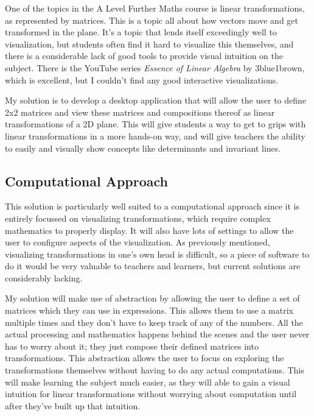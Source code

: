 \documentclass[../main.tex]{subfiles}
\begin{document}
One of the topics in the A Level Further Maths course is linear transformations, as represented by matrices. This is a topic all about how vectors move and get transformed in the plane. It's a topic that lends itself exceedingly well to visualization, but students often find it hard to visualize this themselves, and there is a considerable lack of good tools to provide visual intuition on the subject. There is the YouTube series \textit{Essence of Linear Algebra} by 3blue1brown\cite{essence-of-linear-algebra}, which is excellent, but I couldn't find any good interactive visualizations.

My solution is to develop a desktop application that will allow the user to define 2x2 matrices and view these matrices and compositions thereof as linear transformations of a 2D plane. This will give students a way to get to grips with linear transformations in a more hands-on way, and will give teachers the ability to easily and visually show concepts like determinants and invariant lines.

\subsection{Computational Approach}

This solution is particularly well suited to a computational approach since it is entirely focussed on visualizing transformations, which require complex mathematics to properly display. It will also have lots of settings to allow the user to configure aspects of the visualization. As previously mentioned, visualizing transformations in one's own head is difficult, so a piece of software to do it would be very valuable to teachers and learners, but current solutions are considerably lacking.

My solution will make use of abstraction by allowing the user to define a set of matrices which they can use in expressions. This allows them to use a matrix multiple times and they don't have to keep track of any of the numbers. All the actual processing and mathematics happens behind the scenes and the user never has to worry about it; they just compose their defined matrices into transformations. This abstraction allows the user to focus on exploring the transformations themselves without having to do any actual computations. This will make learning the subject much easier, as they will able to gain a visual intuition for linear transformations without worrying about computation until after they've built up that intuition.
\end{document}
